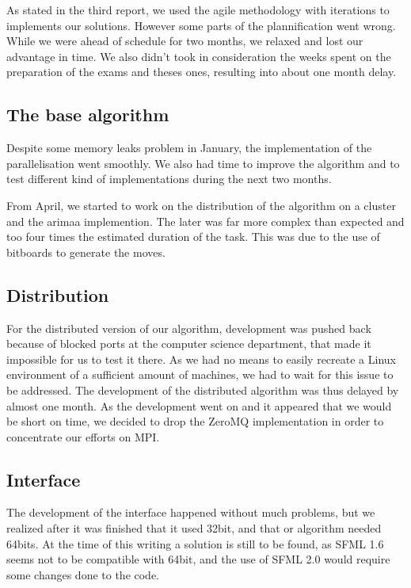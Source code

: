 As stated in the third report, we used the agile methodology with iterations to implements our solutions. However some parts of the plannification went wrong. While we were ahead of schedule for two months, we relaxed and lost our advantage in time. We also didn't took in consideration the weeks spent on the preparation of the exams and theses ones, resulting into about one month delay.

\subsection{The base algorithm}
Despite some memory leaks problem in January, the implementation of the parallelisation went smoothly. We also had time to improve the algorithm and to test different kind of implementations during the next two months.

From April, we started to work on the distribution of the algorithm on a cluster and the arimaa implemention. The later was far more complex than expected and too four times the estimated duration of the task. This was due to the use of bitboards to generate the moves.

\subsection{Distribution}
For the distributed version of our algorithm, development was pushed back because of blocked ports at the computer science department, that made it impossible for us to test it there.
As we had no means to easily recreate a Linux environment of a sufficient amount of machines, we had to wait for this issue to be addressed. The development of the distributed algorithm was thus delayed by almost one month.
As the development went on and it appeared that we would be short on time, we decided to drop the ZeroMQ implementation in order to concentrate our efforts on MPI.

\subsection{Interface}
The development of the interface happened without much problems, but we realized after it was finished that it used 32bit, and that or algorithm needed 64bits.
At the time of this writing a solution is still to be found, as SFML 1.6 seems not to be compatible with 64bit, and the use of SFML 2.0 would require some changes done to the code.